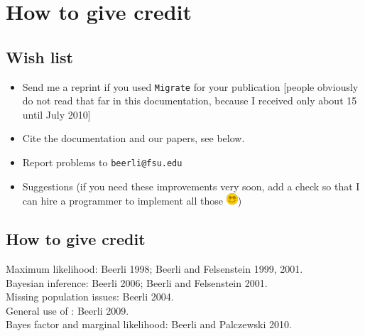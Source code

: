 \chapter{How to give credit}
\section{Wish list}
\begin{itemize}
\item Send me a reprint if you used {\tt Migrate} for 
your publication [people obviously do not read that far in this
documentation, because I received only about 15 until July 2010]
\item Cite the documentation and our papers, see below.
\item Report problems to {\tt beerli@fsu.edu}
\item Suggestions (if you need these improvements very soon,  
add a check so that I can hire a programmer to implement 
all those \includegraphics[height=12pt]{mim/smiley})
\end{itemize}

\section{How to give credit}
Maximum likelihood: Beerli 1998; Beerli and Felsenstein 1999, 2001.\\
Bayesian inference: Beerli 2006; Beerli and Felsenstein 2001. \\
Missing population issues: Beerli 2004.\\
General use of \migrate: Beerli 2009.\\
Bayes factor and marginal likelihood: Beerli and Palczewski 2010.\\

